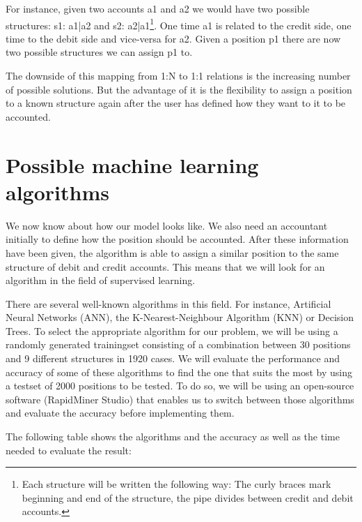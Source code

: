 For instance, given two accounts a1 and a2 we would have two possible structures: s1: {a1|a2} and s2: {a2|a1}\footnote{Each structure will be written the following way: The curly braces mark beginning and end of the structure, the pipe divides between credit and debit accounts.}. One time a1 is related to the credit side, one time to the debit side and vice-versa for a2. Given a position p1 there are now two possible structures we can assign p1 to.

The downside of this mapping from 1:N to 1:1 relations is the increasing number of possible solutions. But the advantage of it is the flexibility to assign a position to a known structure again after the user has defined how they want to it to be accounted.

\section{Possible machine learning algorithms}
\label{sec4.2}
We now know about how our model looks like. We also need an accountant initially to define how the position should be accounted. After these information have been given, the algorithm is able to assign a similar position to the same structure of debit and credit accounts. This means that we will look for an algorithm in the field of supervised learning.

There are several well-known algorithms in this field. For instance, Artificial Neural Networks (ANN), the K-Nearest-Neighbour Algorithm (KNN) or Decision Trees. To select the appropriate algorithm for our problem, we will be using a randomly generated trainingset consisting of a combination between 30 positions and 9 different structures in 1920 cases. We will evaluate the performance and accuracy of some of these algorithms to find the one that suits the most by using a testset of 2000 positions to be tested. To do so, we will be using an open-source software (RapidMiner Studio) that enables us to switch between those algorithms and evaluate the accuracy before implementing them.

The following table shows the algorithms and the accuracy as well as the time needed to evaluate the result:

\begin{table}[!htb]
\centering
{}
\caption{Accuracy of different Machine Learning algorithms}
\label{mlAccuracy}
\end{table}

